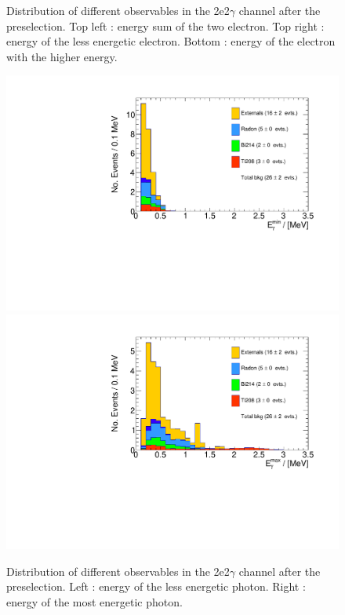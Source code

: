 \documentclass[main.tex]{subfiles}
\begin{document}
\begin{figure}[h!]
\caption{Distribution of different observables in the 2e2$\gamma$ channel after the preselection. Top left : energy sum of the two electron. Top right : energy of the less energetic electron. Bottom : energy of the electron with the higher energy.}
\label{preselection2e2g_150_electron}
\end{figure}


\begin{figure}[h!]
\centering
\includegraphics[scale=0.35]{pictures/FinalResults/bb2nu2/150/preselection/preSelection2e2gBKG_min_gmc_energy.pdf}
\includegraphics[scale=0.35]{pictures/FinalResults/bb2nu2/150/preselection/preSelection2e2gBKG_max_gmc_energy.pdf}
\caption{Distribution of different observables in the 2e2$\gamma$ channel after the preselection. Left : energy of the less energetic photon. Right : energy of the most energetic photon.}
\label{preselection2e2g_150_gamma}
\end{figure}
\end{document}
